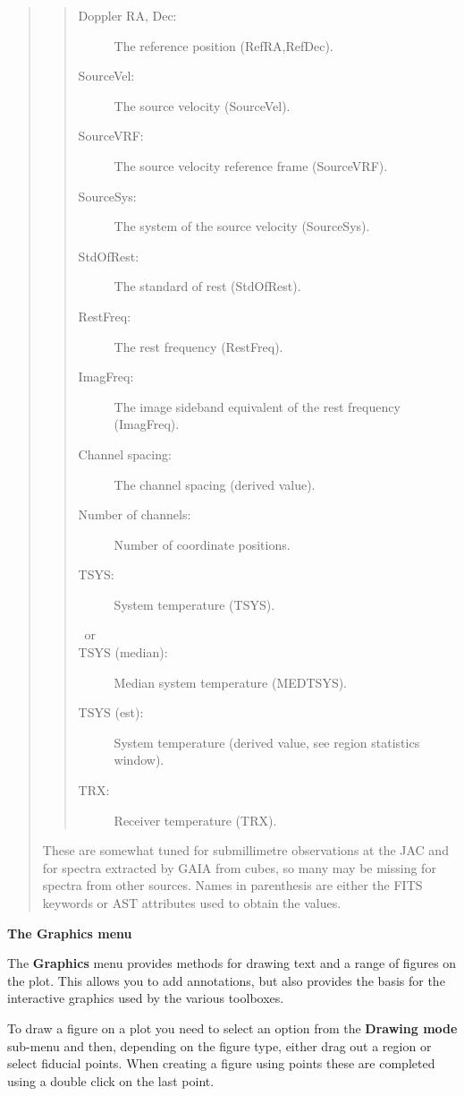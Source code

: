 \documentclass[twoside,11pt,nolof]{starlink}
\renewcommand{\menuitem}[1]{\textbf{#1}}
\providecommand{\subheading}[1]{\textbf{\large{#1}}}
\begin{document}
\begin{quote}
\begin{itemize}
\begin{quote}
\begin{description}
     \item[Doppler RA, Dec:] The reference position (RefRA,RefDec).
     \item[SourceVel:] The source velocity (SourceVel).
     \item[SourceVRF:] The source velocity reference frame (SourceVRF).
     \item[SourceSys:] The system of the source velocity (SourceSys).
     \item[StdOfRest:] The standard of rest (StdOfRest).
     \item[RestFreq:] The rest frequency (RestFreq).
     \item[ImagFreq:] The image sideband equivalent of the rest frequency (ImagFreq).
     \item[Channel spacing:] The channel spacing (derived value).
     \item[Number of channels:] Number of coordinate positions.
     \item[TSYS:] System temperature (TSYS).
     \item[~or]
     \item[TSYS (median):] Median system temperature (MEDTSYS).
     \item[TSYS (est):] System temperature (derived value, see region statistics window).
     \item[TRX:] Receiver temperature (TRX).
  \end{description}
  \end{quote}
  These are somewhat tuned for submillimetre observations at the JAC and for
  spectra extracted by GAIA from cubes, so many may be missing for spectra
  from other sources. Names in parenthesis are either the FITS keywords or
  AST attributes used to obtain the values.

 \end{itemize}
\end{quote}

\subheading{The Graphics menu}

The \menuitem{Graphics} menu provides methods for drawing text and a range of
figures on the plot. This allows you to add annotations, but also provides the
basis for the interactive graphics used by the various toolboxes.

To draw a figure on a plot you need to select an option from the
\menuitem{Drawing mode} sub-menu and then, depending on the figure type, either
drag out a region or select fiducial points. When creating a figure using
points these are completed using a double click on the last point.
\end{document}
